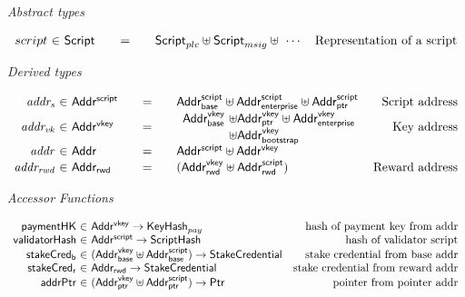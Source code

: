 \documentclass[11pt,a4paper,dvipsnames]{article}
\newcommand{\Addr}{\type{Addr}}
\newcommand{\AddrVKey}{\type{Addr^{vkey}}}
\newcommand{\StakeObject}{\type{StakeCredential}}
\newcommand{\AddrRWD}{\type{Addr_{rwd}}}
\newcommand{\AddrRWDVKey}{\type{Addr_{rwd}^{vkey}}}
\newcommand{\AddrRWDScr}{\type{Addr_{rwd}^{script}}}
\newcommand{\AddrVKeyB}{\type{Addr^{vkey}_{base}}}
\newcommand{\AddrVKeyP}{\type{Addr^{vkey}_{ptr}}}
\newcommand{\AddrVKeyE}{\type{Addr^{vkey}_{enterprise}}}
\newcommand{\AddrVKeyBS}{\type{Addr^{vkey}_{bootstrap}}}
\newcommand{\AddrScr}{\type{Addr^{script}}}
\newcommand{\AddrScrBase}{\type{Addr_{base}^{script}}}
\newcommand{\AddrScrEnterprise}{\type{Addr_{enterprise}^{script}}}
\newcommand{\AddrScrPtr}{\type{Addr_{ptr}^{script}}}
\newcommand{\HashScr}{\type{ScriptHash}}
\newcommand{\Ptr}{\type{Ptr}}
\newcommand{\Script}{\type{Script}}
\newcommand{\ScriptPlutus}{\Script_{plc}}
\newcommand{\ScriptMSig}{\Script_{msig}}
\newcommand{\KeyHash}{\type{KeyHash}}
\theoremstyle{definition}
\begin{document}
\begin{figure*}[hbt]
  \emph{Abstract types}

  \begin{equation*}
    \begin{array}{r@{~\in~}l@{\qquad=\qquad}lr}
      script & \Script & \ScriptPlutus\uniondistinct\ScriptMSig\uniondistinct\,\,\cdots  & \text{Representation of a script}
    \end{array}
  \end{equation*}

  \emph{Derived types}

  \begin{equation*}
    \begin{array}{r@{~\in~}l@{\qquad=\qquad}lr}
      \var{addr_{s}} & \AddrScr & \AddrScrBase \uniondistinct \AddrScrEnterprise
                              \uniondistinct \AddrScrPtr & \text{Script address} \\
      \var{addr_{vk}} & \AddrVKey & \begin{array}{l@{~\uniondistinct}l}
                             \AddrVKeyB & \AddrVKeyP \uniondistinct \AddrVKeyE \\
                                    & \AddrVKeyBS
                           \end{array}
                                & \text{Key address}\\
      \var{addr} & \Addr & \AddrScr \uniondistinct \AddrVKey \\
      \var{addr_{rwd}} & \AddrRWD & (\AddrRWDVKey \uniondistinct \AddrRWDScr)
                                                         & \text{Reward address}
    \end{array}
  \end{equation*}

  \emph{Accessor Functions}

  \begin{equation*}
    \begin{array}{r@{~\in~}lr}
      \fun{paymentHK} & \AddrVKey \to \KeyHash_{pay}
      & \text{hash of payment key from addr}\\
      \fun{validatorHash} & \AddrScr \to \HashScr & \text{hash of validator
                                                    script} \\
      \fun{stakeCred_{b}} & (\AddrVKeyB \uniondistinct \AddrScrBase) \to
                          \StakeObject & \text{stake credential from base
                                      addr}\\
      \fun{stakeCred_{r}} & \AddrRWD \to \StakeObject & \text{stake credential
                                                   from reward addr}\\
      \fun{addrPtr} & (\AddrVKeyP \uniondistinct \AddrScrPtr) \to \Ptr &
                                                                         \text{pointer
                                                                         from
                                                                         pointer addr}
    \end{array}
  \end{equation*}


\end{figure*}
\end{document}
